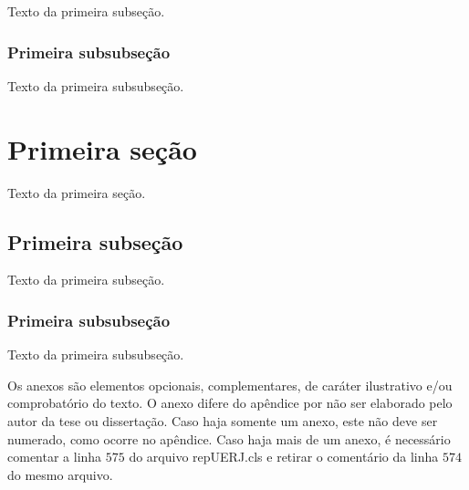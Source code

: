 \documentclass[a4paper,12pt,oneside,onecolumn,final,fleqn]{repUERJ}
\begin{document}
Texto da primeira subseção.

\subsubsection{Primeira subsubseção}

Texto da primeira subsubseção.



\section{Primeira seção}

Texto da primeira seção.

\subsection{Primeira subseção}

Texto da primeira subseção.

\subsubsection{Primeira subsubseção}

Texto da primeira subsubseção.


\annex %


Os anexos são elementos opcionais, complementares, de caráter ilustrativo e/ou comprobatório do texto. O anexo difere do apêndice por não ser elaborado pelo autor da tese ou dissertação. Caso haja somente um anexo, este não deve ser numerado, como ocorre no apêndice.
Caso haja mais de um anexo, é necessário comentar a linha $575$ do arquivo repUERJ.cls e retirar o comentário da linha $574$ do mesmo arquivo.
\end{document}
